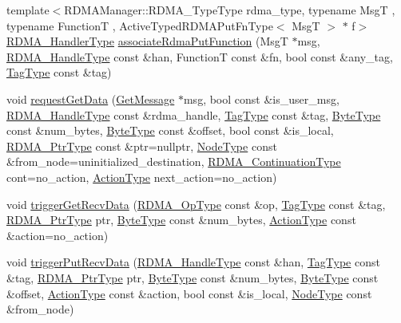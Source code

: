 \begin{DoxyCompactItemize}
{\footnotesize template$<$R\+D\+M\+A\+Manager\+::\+R\+D\+M\+A\+\_\+\+Type\+Type rdma\+\_\+type, typename MsgT , typename FunctionT , Active\+Typed\+R\+D\+M\+A\+Put\+Fn\+Type$<$ Msg\+T $>$ $\ast$ f$>$ }\\\hyperlink{namespacevt_a9530efb893c0f3846e8ac5f0507e0f49}{R\+D\+M\+A\+\_\+\+Handler\+Type} \hyperlink{structvt_1_1rdma_1_1_r_d_m_a_manager_a08df53322f7811c8a80911506d3db362}{associate\+Rdma\+Put\+Function} (MsgT $\ast$msg, \hyperlink{namespacevt_a10442579ec4e7ebef223818e64bcf908}{R\+D\+M\+A\+\_\+\+Handle\+Type} const \&han, FunctionT const \&fn, bool const \&any\+\_\+tag, \hyperlink{namespacevt_a84ab281dae04a52a4b243d6bf62d0e52}{Tag\+Type} const \&tag)
\item 
void \hyperlink{structvt_1_1rdma_1_1_r_d_m_a_manager_aee554383c0376e3751d0957b2c04cc75}{request\+Get\+Data} (\hyperlink{namespacevt_1_1rdma_acce0da4c9ea1233c3f132c1971943653}{Get\+Message} $\ast$msg, bool const \&is\+\_\+user\+\_\+msg, \hyperlink{namespacevt_a10442579ec4e7ebef223818e64bcf908}{R\+D\+M\+A\+\_\+\+Handle\+Type} const \&rdma\+\_\+handle, \hyperlink{namespacevt_a84ab281dae04a52a4b243d6bf62d0e52}{Tag\+Type} const \&tag, \hyperlink{namespacevt_aab8d55968084610ce3b17057981e9300}{Byte\+Type} const \&num\+\_\+bytes, \hyperlink{namespacevt_aab8d55968084610ce3b17057981e9300}{Byte\+Type} const \&offset, bool const \&is\+\_\+local, \hyperlink{namespacevt_aab05b4a584f7ee835a6d0f66915cf59b}{R\+D\+M\+A\+\_\+\+Ptr\+Type} const \&ptr=nullptr, \hyperlink{namespacevt_a866da9d0efc19c0a1ce79e9e492f47e2}{Node\+Type} const \&from\+\_\+node=uninitialized\+\_\+destination, \hyperlink{namespacevt_a9880273f1697d78c2171f8d8f044de51}{R\+D\+M\+A\+\_\+\+Continuation\+Type} cont=no\+\_\+action, \hyperlink{namespacevt_ae0a5a7b18cc99d7b732cb4d44f46b0f3}{Action\+Type} next\+\_\+action=no\+\_\+action)
\item 
void \hyperlink{structvt_1_1rdma_1_1_r_d_m_a_manager_a38e87a342616670eb3679e649e3c39cf}{trigger\+Get\+Recv\+Data} (\hyperlink{namespacevt_1_1rdma_a9b966d9780a2b41afe7cd7b7b4b20300}{R\+D\+M\+A\+\_\+\+Op\+Type} const \&op, \hyperlink{namespacevt_a84ab281dae04a52a4b243d6bf62d0e52}{Tag\+Type} const \&tag, \hyperlink{namespacevt_aab05b4a584f7ee835a6d0f66915cf59b}{R\+D\+M\+A\+\_\+\+Ptr\+Type} ptr, \hyperlink{namespacevt_aab8d55968084610ce3b17057981e9300}{Byte\+Type} const \&num\+\_\+bytes, \hyperlink{namespacevt_ae0a5a7b18cc99d7b732cb4d44f46b0f3}{Action\+Type} const \&action=no\+\_\+action)
\item 
void \hyperlink{structvt_1_1rdma_1_1_r_d_m_a_manager_a7670a52bb5673c5e15a6ff21097847f3}{trigger\+Put\+Recv\+Data} (\hyperlink{namespacevt_a10442579ec4e7ebef223818e64bcf908}{R\+D\+M\+A\+\_\+\+Handle\+Type} const \&han, \hyperlink{namespacevt_a84ab281dae04a52a4b243d6bf62d0e52}{Tag\+Type} const \&tag, \hyperlink{namespacevt_aab05b4a584f7ee835a6d0f66915cf59b}{R\+D\+M\+A\+\_\+\+Ptr\+Type} ptr, \hyperlink{namespacevt_aab8d55968084610ce3b17057981e9300}{Byte\+Type} const \&num\+\_\+bytes, \hyperlink{namespacevt_aab8d55968084610ce3b17057981e9300}{Byte\+Type} const \&offset, \hyperlink{namespacevt_ae0a5a7b18cc99d7b732cb4d44f46b0f3}{Action\+Type} const \&action, bool const \&is\+\_\+local, \hyperlink{namespacevt_a866da9d0efc19c0a1ce79e9e492f47e2}{Node\+Type} const \&from\+\_\+node)

\end{DoxyCompactItemize}
